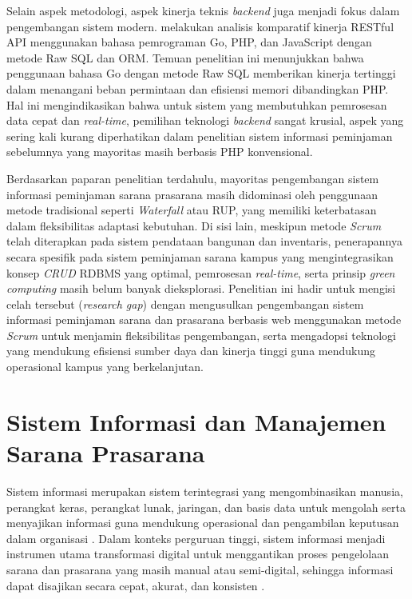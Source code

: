 \clearpage
Selain aspek metodologi, aspek kinerja teknis \textit{backend} juga menjadi fokus dalam pengembangan sistem modern. \textcite{Pratama2025} melakukan analisis komparatif kinerja RESTful API menggunakan bahasa pemrograman Go, PHP, dan JavaScript dengan metode Raw SQL dan ORM. Temuan penelitian ini menunjukkan bahwa penggunaan bahasa Go dengan metode Raw SQL memberikan kinerja tertinggi dalam menangani beban permintaan dan efisiensi memori dibandingkan PHP. Hal ini mengindikasikan bahwa untuk sistem yang membutuhkan pemrosesan data cepat dan \textit{real-time}, pemilihan teknologi \textit{backend} sangat krusial, aspek yang sering kali kurang diperhatikan dalam penelitian sistem informasi peminjaman sebelumnya yang mayoritas masih berbasis PHP konvensional.

Berdasarkan paparan penelitian terdahulu, mayoritas pengembangan sistem informasi peminjaman sarana prasarana masih didominasi oleh penggunaan metode tradisional seperti \textit{Waterfall} atau RUP, yang memiliki keterbatasan dalam fleksibilitas adaptasi kebutuhan. Di sisi lain, meskipun metode \textit{Scrum} telah diterapkan pada sistem pendataan bangunan dan inventaris, penerapannya secara spesifik pada sistem peminjaman sarana kampus yang mengintegrasikan konsep \textit{CRUD} RDBMS yang optimal, pemrosesan \textit{real-time}, serta prinsip \textit{green computing} masih belum banyak dieksplorasi. Penelitian ini hadir untuk mengisi celah tersebut (\textit{research gap}) dengan mengusulkan pengembangan sistem informasi peminjaman sarana dan prasarana berbasis web menggunakan metode \textit{Scrum} untuk menjamin fleksibilitas pengembangan, serta mengadopsi teknologi yang mendukung efisiensi sumber daya dan kinerja tinggi guna mendukung operasional kampus yang berkelanjutan.

\section{Sistem Informasi dan Manajemen Sarana Prasarana}
Sistem informasi merupakan sistem terintegrasi yang mengombinasikan manusia, perangkat keras, perangkat lunak, jaringan, dan basis data untuk mengolah serta menyajikan informasi guna mendukung operasional dan pengambilan keputusan dalam organisasi \parencite{Herlambang2020}. Dalam konteks perguruan tinggi, sistem informasi menjadi instrumen utama transformasi digital untuk menggantikan proses pengelolaan sarana dan prasarana yang masih manual atau semi-digital, sehingga informasi dapat disajikan secara cepat, akurat, dan konsisten \parencite{Purwati2022}.

